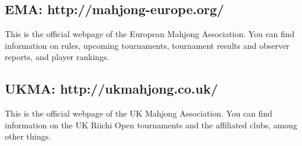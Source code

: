 \subsection*{EMA: \textbf{http://mahjong-europe.org/}} 
This is the official webpage of the European Mahjong Association. You can find information on rules, upcoming tournaments, tournament results and observer reports, and player rankings. 

\subsection*{UKMA: \textbf{http://ukmahjong.co.uk/}} 
This is the official webpage of the UK Mahjong Association. You can find information on the UK Riichi Open tournaments and the affiliated clubs, among other things. 

